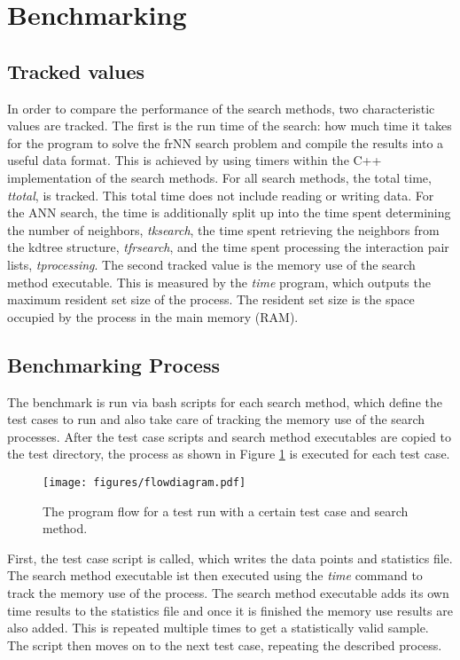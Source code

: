 \pagebreak

\section{Benchmarking}
\label{SECTION:BENCHMARKING}

\subsection{Tracked values}

In order to compare the performance of the search methods, two characteristic values are tracked. The first is the run time of the search: how much time it takes for the program to solve the frNN search problem and compile the results into a useful data format. This is achieved by using timers within the C++ implementation of the search methods. For all search methods, the total time, {\itshape ttotal}, is tracked. This total time does not include reading or writing data. For the ANN search, the time is additionally split up into the time spent determining the number of neighbors, {\itshape tksearch}, the time spent retrieving the neighbors from the kdtree structure, {\itshape tfrsearch}, and the time spent processing the interaction pair lists, {\itshape tprocessing}. The second tracked value is the memory use of the search method executable. This is measured by the {\itshape time} program, which outputs the maximum resident set size of the process. The resident set size is the space occupied by the process in the main memory (RAM).

\subsection{Benchmarking Process}

The benchmark is run via bash scripts for each search method, which define the test cases to run and also take care of tracking the memory use of the search processes. After the test case scripts and search method executables are copied to the test directory, the process as shown in Figure \ref{FIG:BENCHMARKING} is executed for each test case.

\begin{figure}[h]
	\centering
	\texttt{[image: figures/flowdiagram.pdf]}
	\caption{The program flow for a test run with a certain test case and search method.}
	\label{FIG:BENCHMARKING}
\end{figure}

First, the test case script is called, which writes the data points and statistics file. The search method executable ist then executed using the {\itshape time} command to track the memory use of the process. The search method executable adds its own time results to the statistics file and once it is finished the memory use results are also added. This is repeated multiple times to get a statistically valid sample. The script then moves on to the next test case, repeating the described process.